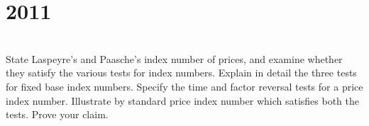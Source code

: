 \section*{2011}
\vspace{-.5cm}
\hrulefill \smallskip\\
 State Laspeyre's and Paasche's index number of prices, and examine whether they satisfy the various tests for index numbers.
\myline
{} Explain in detail the three tests for fixed base index numbers.
\myline
{} Specify the time and factor reversal tests for a price index number. Illustrate by standard price index number which satisfies both the tests. Prove your claim.
